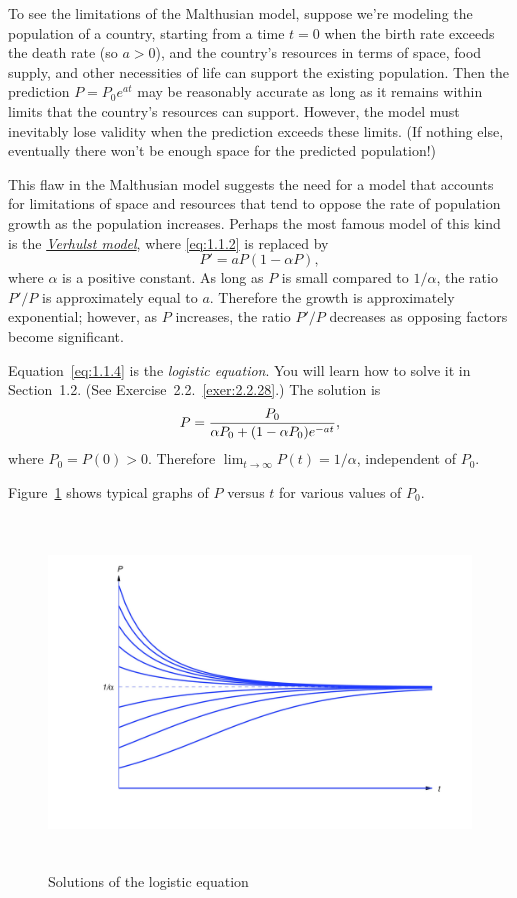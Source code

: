 \documentclass{ximera}
\begin{document}
To see the limitations of the Malthusian model, suppose  we're
modeling the  population of a country, starting from a time
$t=0$ when the birth rate exceeds the death rate (so $a>0$), and
the country's resources in terms of space, food supply, and other
necessities of life can support the existing population. Then the
prediction $P=P_0e^{at}$ may be reasonably accurate as long as
it remains within limits that the country's resources can support.
However, the model must inevitably lose validity when the prediction
exceeds these limits. (If nothing else, eventually there won't be
enough space for the predicted population!)

This flaw in the Malthusian model suggests the need for a model that
accounts for limitations of space and resources that tend to oppose
the rate of population growth as the population increases.
 Perhaps the most famous model of this kind is the
\href{http://www-history.mcs.st-and.ac.uk/Mathematicians/Verhulst.html}
{\color{blue}\it Verhulst
 model\/}, where \eqref{eq:1.1.2} is
replaced by
\begin{equation} \label{eq:1.1.4}
P'=aP(1-\alpha P),
\end{equation}
where $\alpha$ is a positive constant.
As long as $P$ is small
compared to $1/\alpha$, the ratio $P'/P$  is approximately equal to $a$.
Therefore the growth is approximately exponential;     however, as $P$
increases, the ratio $P'/P$  decreases as opposing factors
become significant.

Equation~\eqref{eq:1.1.4} is  the {\color{blue}\it logistic equation\/}. You
will learn how to solve it in Section~1.2. (See
Exercise~2.2.~\hspace*{-3pt}\ref{exer:2.2.28}.) The solution is
$$
P={P_0\over\alpha P_0+(1-\alpha P_0)e^{-at}},
$$
where $P_0=P(0)>0$. Therefore
$\lim_{t\to\infty}P(t)=1/\alpha$, independent of $P_0$.

Figure~\ref{figure:1.1.1} shows typical graphs of $P$ versus $t$ for
various values of  $P_0$.

\begin{figure}[h]
  \centering
  \includegraphics[bb=-78 148 689 643,width=5.67in,height=3.66in,keepaspectratio]{fig010101}
\color{blue}
  \caption{ Solutions of the logistic equation}
  \label{figure:1.1.1}
\end{figure}
\end{document}
